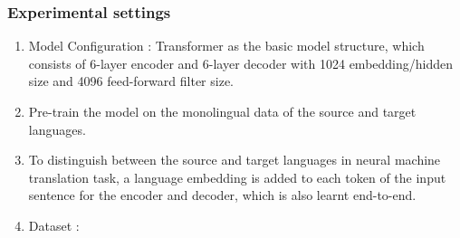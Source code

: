 \subsubsection{Experimental settings}
\begin{enumerate}
    \item Model Configuration : 
    Transformer as the basic model structure, which consists of 6-layer encoder and 6-layer decoder with 1024 embedding/hidden size and 4096 feed-forward filter size. 
    \item Pre-train the model on the monolingual data of the source and target languages.
    \item To distinguish between the source and target languages in neural machine translation task, a language embedding is added to each token of the input sentence for the encoder and decoder, which is also learnt end-to-end. 
    \item Dataset : 
\end{enumerate}